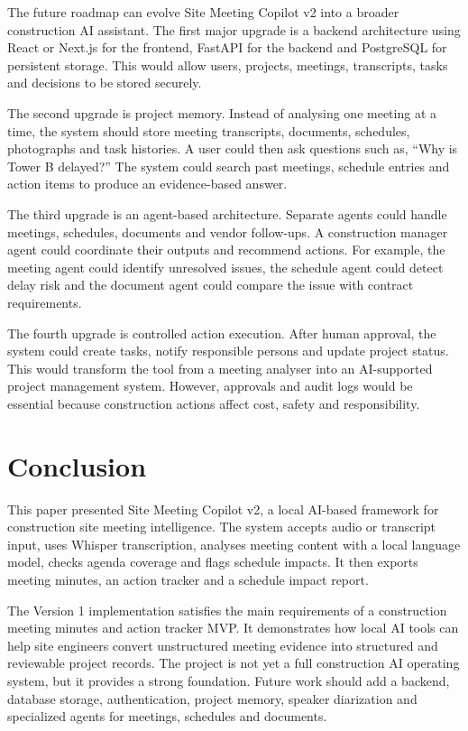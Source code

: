 \documentclass[11pt,a4paper]{article}
\begin{document}
The future roadmap can evolve Site Meeting Copilot v2 into a broader construction AI assistant. The first major upgrade is a backend architecture using React or Next.js for the frontend, FastAPI for the backend and PostgreSQL for persistent storage. This would allow users, projects, meetings, transcripts, tasks and decisions to be stored securely.

The second upgrade is project memory. Instead of analysing one meeting at a time, the system should store meeting transcripts, documents, schedules, photographs and task histories. A user could then ask questions such as, ``Why is Tower B delayed?'' The system could search past meetings, schedule entries and action items to produce an evidence-based answer.

The third upgrade is an agent-based architecture. Separate agents could handle meetings, schedules, documents and vendor follow-ups. A construction manager agent could coordinate their outputs and recommend actions. For example, the meeting agent could identify unresolved issues, the schedule agent could detect delay risk and the document agent could compare the issue with contract requirements.

The fourth upgrade is controlled action execution. After human approval, the system could create tasks, notify responsible persons and update project status. This would transform the tool from a meeting analyser into an AI-supported project management system. However, approvals and audit logs would be essential because construction actions affect cost, safety and responsibility.

\section{Conclusion}

This paper presented Site Meeting Copilot v2, a local AI-based framework for construction site meeting intelligence. The system accepts audio or transcript input, uses Whisper transcription, analyses meeting content with a local language model, checks agenda coverage and flags schedule impacts. It then exports meeting minutes, an action tracker and a schedule impact report.

The Version 1 implementation satisfies the main requirements of a construction meeting minutes and action tracker MVP. It demonstrates how local AI tools can help site engineers convert unstructured meeting evidence into structured and reviewable project records. The project is not yet a full construction AI operating system, but it provides a strong foundation. Future work should add a backend, database storage, authentication, project memory, speaker diarization and specialized agents for meetings, schedules and documents.
\end{document}
